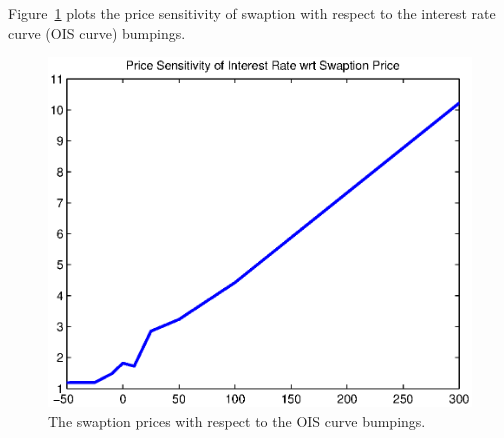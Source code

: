 Figure~\ref{fig::swaption_prices} plots the price sensitivity of swaption with respect to the interest rate curve (OIS curve) bumpings.

\begin{center}
  \begin{figure}
      \includegraphics[scale=0.6]{swaption_prices.eps}
      \caption{The swaption prices with respect to the OIS curve bumpings.}\label{fig::swaption_prices}
  \end{figure}
\end{center}